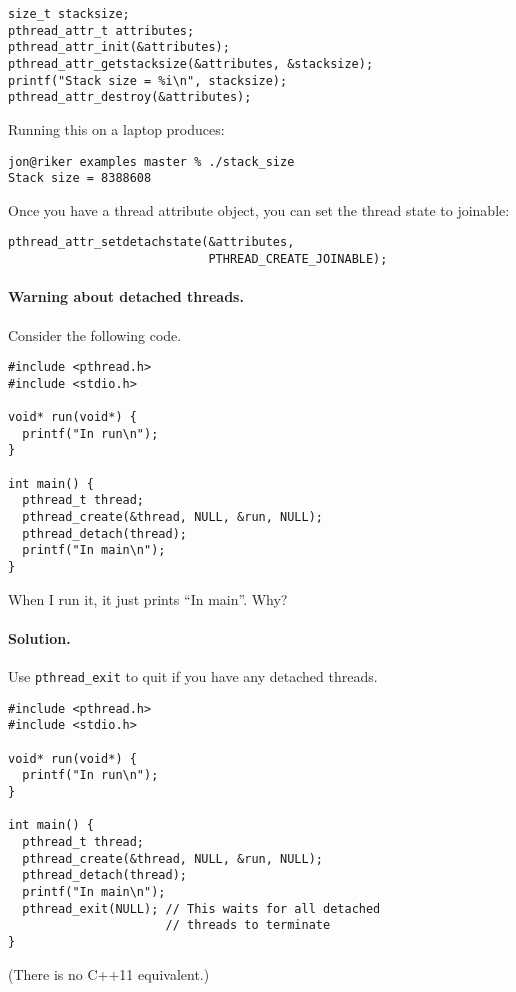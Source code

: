   \begin{verbatim}
size_t stacksize;
pthread_attr_t attributes;
pthread_attr_init(&attributes);
pthread_attr_getstacksize(&attributes, &stacksize);
printf("Stack size = %i\n", stacksize);
pthread_attr_destroy(&attributes);
  \end{verbatim}

Running this on a laptop produces:

  \begin{verbatim}
jon@riker examples master % ./stack_size 
Stack size = 8388608
  \end{verbatim}

Once you have a thread attribute object, you can set the thread state to joinable:
  \begin{verbatim}
pthread_attr_setdetachstate(&attributes,
                            PTHREAD_CREATE_JOINABLE);
  \end{verbatim}

\paragraph{Warning about detached threads.} Consider the following code.

\begin{verbatim}
#include <pthread.h>
#include <stdio.h>

void* run(void*) {
  printf("In run\n");
}

int main() {
  pthread_t thread;
  pthread_create(&thread, NULL, &run, NULL);
  pthread_detach(thread);
  printf("In main\n");
}
\end{verbatim}

  When I run it, it just prints ``In main''. Why?

\paragraph{Solution.} Use {\tt pthread\_exit} to quit if you have any detached threads.
  \begin{verbatim}
#include <pthread.h>
#include <stdio.h>

void* run(void*) {
  printf("In run\n");
}

int main() {
  pthread_t thread;
  pthread_create(&thread, NULL, &run, NULL);
  pthread_detach(thread);
  printf("In main\n");
  pthread_exit(NULL); // This waits for all detached
                      // threads to terminate
}
  \end{verbatim}
(There is no C++11 equivalent.)

